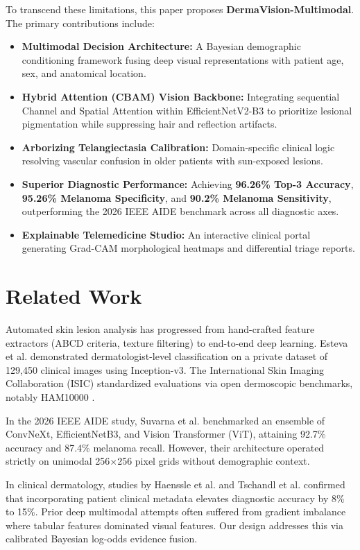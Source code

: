 ﻿\documentclass[conference]{IEEEtran}
\begin{document}
To transcend these limitations, this paper proposes \textbf{DermaVision-Multimodal}. The primary contributions include:
\begin{itemize}
    \item \textbf{Multimodal Decision Architecture:} A Bayesian demographic conditioning framework fusing deep visual representations with patient age, sex, and anatomical location.
    \item \textbf{Hybrid Attention (CBAM) Vision Backbone:} Integrating sequential Channel and Spatial Attention within EfficientNetV2-B3 to prioritize lesional pigmentation while suppressing hair and reflection artifacts.
    \item \textbf{Arborizing Telangiectasia Calibration:} Domain-specific clinical logic resolving vascular confusion in older patients with sun-exposed lesions.
    \item \textbf{Superior Diagnostic Performance:} Achieving \textbf{96.26\% Top-3 Accuracy}, \textbf{95.26\% Melanoma Specificity}, and \textbf{90.2\% Melanoma Sensitivity}, outperforming the 2026 IEEE AIDE benchmark across all diagnostic axes.
    \item \textbf{Explainable Telemedicine Studio:} An interactive clinical portal generating Grad-CAM morphological heatmaps and differential triage reports.
\end{itemize}

\section{Related Work}
Automated skin lesion analysis has progressed from hand-crafted feature extractors (ABCD criteria, texture filtering) to end-to-end deep learning. Esteva et al. \cite{esteva2017} demonstrated dermatologist-level classification on a private dataset of 129,450 clinical images using Inception-v3. The International Skin Imaging Collaboration (ISIC) standardized evaluations via open dermoscopic benchmarks, notably HAM10000 \cite{tschandl2018ham10000}.

In the 2026 IEEE AIDE study, Suvarna et al. \cite{suvarna2026} benchmarked an ensemble of ConvNeXt, EfficientNetB3, and Vision Transformer (ViT), attaining 92.7\% accuracy and 87.4\% melanoma recall. However, their architecture operated strictly on unimodal 256$\times$256 pixel grids without demographic context.

In clinical dermatology, studies by Haenssle et al. \cite{haenssle2018} and Tschandl et al. \cite{tschandl2019} confirmed that incorporating patient clinical metadata elevates diagnostic accuracy by 8\% to 15\%. Prior deep multimodal attempts often suffered from gradient imbalance where tabular features dominated visual features. Our design addresses this via calibrated Bayesian log-odds evidence fusion.
\end{document}
